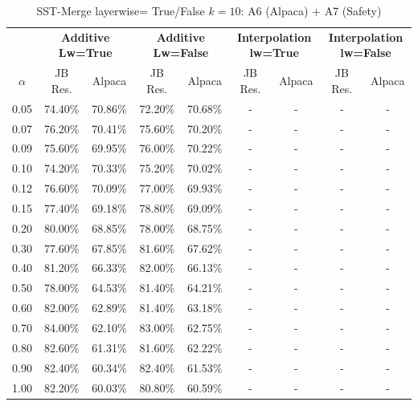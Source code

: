 \begin{table}[h]
\centering
\caption{SST-Merge layerwise= True/False $k=10$: A6 (Alpaca) + A7 (Safety)}
\label{tab:res_a6_sst_10}
\begin{tabular}{c|cc|cc|cc|cc}
\hline
 & \multicolumn{2}{c|}{\textbf{Additive Lw=True}} & \multicolumn{2}{c|}{\textbf{Additive Lw=False}} & \multicolumn{2}{c|}{\textbf{Interpolation lw=True}}& \multicolumn{2}{c}{\textbf{Interpolation lw=False}} \\
$\alpha$ & JB Res. & Alpaca & JB Res. & Alpaca & JB Res. & Alpaca & JB Res. & Alpaca \\
\hline
0.05 & 74.40\% & 70.86\% & 72.20\% & 70.68\% & - & - & - & - \\
0.07 & 76.20\% & 70.41\% & 75.60\% & 70.20\% & - & - & - & - \\
0.09 & 75.60\% & 69.95\% & 76.00\% & 70.22\% & - & - & - & - \\
0.10 & 74.20\% & 70.33\% & 75.20\% & 70.02\% & - & - & - & - \\
0.12 & 76.60\% & 70.09\% & 77.00\% & 69.93\% & - & - & - & - \\
0.15 & 77.40\% & 69.18\% & 78.80\% & 69.09\% & - & - & - & - \\
0.20 & 80.00\% & 68.85\% & 78.00\% & 68.75\% & - & - & - & - \\
0.30 & 77.60\% & 67.85\% & 81.60\% & 67.62\% & - & - & - & - \\
0.40 & 81.20\% & 66.33\% & 82.00\% & 66.13\% & - & - & - & - \\
0.50 & 78.00\% & 64.53\% & 81.40\% & 64.21\% & - & - & - & - \\
0.60 & 82.00\% & 62.89\% & 81.40\% & 63.18\% & - & - & - & - \\
0.70 & 84.00\% & 62.10\% & 83.00\% & 62.75\% & - & - & - & - \\
0.80 & 82.60\% & 61.31\% & 81.60\% & 62.22\% & - & - & - & - \\
0.90 & 82.40\% & 60.34\% & 82.40\% & 61.53\% & - & - & - & - \\
1.00 & 82.20\% & 60.03\% & 80.80\% & 60.59\% & - & - & - & - \\
\hline
\end{tabular}
\end{table}
\FloatBarrier

